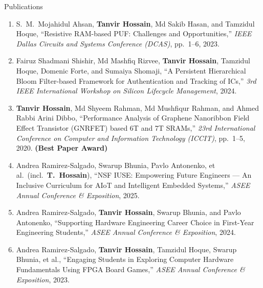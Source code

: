 \begin{rSection}{Publications}
\begin{enumerate}[label=\arabic*., itemsep=-0.1em, leftmargin=1.5em]
    \item S.\ M.\ Mojahidul Ahsan, \textbf{Tanvir Hossain}, Md Sakib Hasan, and Tamzidul Hoque, ``Resistive RAM-based PUF: Challenges and Opportunities,'' \emph{IEEE Dallas Circuits and Systems Conference (DCAS)}, pp.\ 1--6, 2023. 

    \item Fairuz Shadmani Shishir, Md Mashfiq Rizvee, \textbf{Tanvir Hossain}, Tamzidul Hoque, Domenic Forte, and Sumaiya Shomaji, ``A Persistent Hierarchical Bloom Filter-based Framework for Authentication and Tracking of ICs,'' \emph{3rd IEEE International Workshop on Silicon Lifecycle Management}, 2024. 

    \item \textbf{Tanvir Hossain}, Md Shyeem Rahman, Md Mushfiqur Rahman, and Ahmed Rabbi Arini Dibbo, ``Performance Analysis of Graphene Nanoribbon Field Effect Transistor (GNRFET) based 6T and 7T SRAMs,'' \emph{23rd International Conference on Computer and Information Technology (ICCIT)}, pp.\ 1--5, 2020.  \textbf{(Best Paper Award)}

    \item Andrea Ramirez-Salgado, Swarup Bhunia, Pavlo Antonenko, et al.\ (incl.\ \textbf{T.\ Hossain}), ``NSF IUSE: Empowering Future Engineers --- An Inclusive Curriculum for AIoT and Intelligent Embedded Systems,'' \emph{ASEE Annual Conference \& Exposition}, 2025. 

    \item Andrea Ramirez-Salgado, \textbf{Tanvir Hossain}, Swarup Bhunia, and Pavlo Antonenko, ``Supporting Hardware Engineering Career Choice in First-Year Engineering Students,'' \emph{ASEE Annual Conference \& Exposition}, 2024. 

    \item Andrea Ramirez-Salgado, \textbf{Tanvir Hossain}, Tamzidul Hoque, Swarup Bhunia, et al., ``Engaging Students in Exploring Computer Hardware Fundamentals Using FPGA Board Games,'' \emph{ASEE Annual Conference \& Exposition}, 2023. 
\end{enumerate}

\end{rSection}
